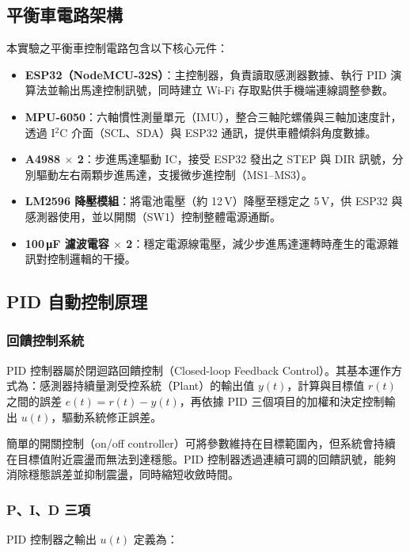 \documentclass[12pt]{article}
\begin{document}
\subsection{平衡車電路架構}

本實驗之平衡車控制電路包含以下核心元件：

\begin{itemize}
    \item \textbf{ESP32（NodeMCU-32S）}：主控制器，負責讀取感測器數據、執行 PID 演算法並輸出馬達控制訊號，同時建立 Wi-Fi 存取點供手機端連線調整參數。
    \item \textbf{MPU-6050}：六軸慣性測量單元（IMU），整合三軸陀螺儀與三軸加速度計，透過 I$^2$C 介面（SCL、SDA）與 ESP32 通訊，提供車體傾斜角度數據。
    \item \textbf{A4988 $\times$ 2}：步進馬達驅動 IC，接受 ESP32 發出之 STEP 與 DIR 訊號，分別驅動左右兩顆步進馬達，支援微步進控制（MS1--MS3）。
    \item \textbf{LM2596 降壓模組}：將電池電壓（約 12\,V）降壓至穩定之 5\,V，供 ESP32 與感測器使用，並以開關（SW1）控制整體電源通斷。
    \item \textbf{100\,\si{\micro\farad} 濾波電容 $\times$ 2}：穩定電源線電壓，減少步進馬達運轉時產生的電源雜訊對控制邏輯的干擾。
\end{itemize}

\subsection{PID 自動控制原理}

\subsubsection{回饋控制系統}

PID 控制器屬於閉迴路回饋控制（Closed-loop Feedback Control）。其基本運作方式為：感測器持續量測受控系統（Plant）的輸出值 $y(t)$，計算與目標值 $r(t)$ 之間的誤差 $e(t) = r(t) - y(t)$，再依據 PID 三個項目的加權和決定控制輸出 $u(t)$，驅動系統修正誤差。

簡單的開關控制（on/off controller）可將參數維持在目標範圍內，但系統會持續在目標值附近震盪而無法到達穩態。PID 控制器透過連續可調的回饋訊號，能夠消除穩態誤差並抑制震盪，同時縮短收斂時間。

\subsubsection{P、I、D 三項}

PID 控制器之輸出 $u(t)$ 定義為：
\end{document}
